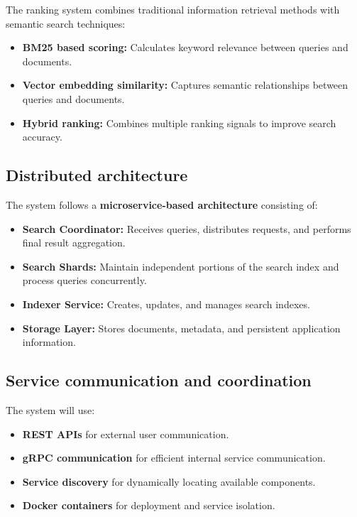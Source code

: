 \documentclass[11pt]{article}
\begin{document}
The ranking system combines traditional information retrieval methods with semantic search techniques:

\begin{itemize}

\item \textbf{BM25 based scoring:} Calculates keyword relevance between queries and documents.

\item \textbf{Vector embedding similarity:} Captures semantic relationships between queries and documents.

\item \textbf{Hybrid ranking:} Combines multiple ranking signals to improve search accuracy.

\end{itemize}


\subsection{Distributed architecture}

The system follows a \textbf{microservice-based architecture} consisting of:

\begin{itemize}

\item \textbf{Search Coordinator:} Receives queries, distributes requests, and performs final result aggregation.

\item \textbf{Search Shards:} Maintain independent portions of the search index and process queries concurrently.

\item \textbf{Indexer Service:} Creates, updates, and manages search indexes.

\item \textbf{Storage Layer:} Stores documents, metadata, and persistent application information.

\end{itemize}


\subsection{Service communication and coordination}

The system will use:

\begin{itemize}

\item \textbf{REST APIs} for external user communication.

\item \textbf{gRPC communication} for efficient internal service communication.

\item \textbf{Service discovery} for dynamically locating available components.

\item \textbf{Docker containers} for deployment and service isolation.

\end{itemize}
\end{document}
